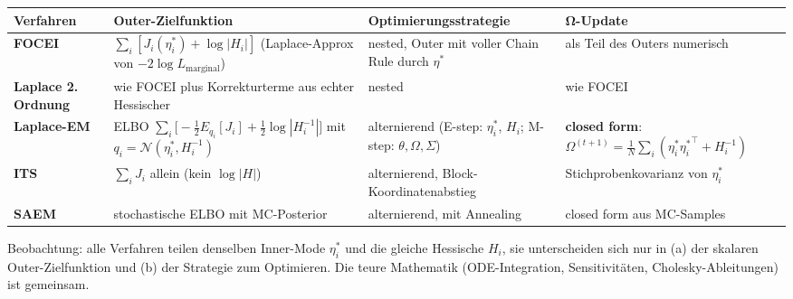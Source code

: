 \documentclass[
]{article}
\newcounter{none} %
\begin{document}
{\def\LTcaptype{none} %
\begin{longtable}[]{@{}
  >{\raggedright\arraybackslash}p{}
  >{\raggedright\arraybackslash}p{}
  >{\raggedright\arraybackslash}p{}
  >{\raggedright\arraybackslash}p{}@{}}
\toprule\noalign{}
\begin{minipage}[b]{\linewidth}\raggedright
Verfahren
\end{minipage} & \begin{minipage}[b]{\linewidth}\raggedright
Outer-Zielfunktion
\end{minipage} & \begin{minipage}[b]{\linewidth}\raggedright
Optimierungsstrategie
\end{minipage} & \begin{minipage}[b]{\linewidth}\raggedright
Ω-Update
\end{minipage} \\
\midrule\noalign{}
\endhead
\bottomrule\noalign{}
\endlastfoot
\textbf{FOCEI} & \(\sum_i [J_i(\eta_i^*) + \log|H_i|]\) (Laplace-Approx
von \(-2\log L_{\text{marginal}}\)) & nested, Outer mit voller Chain
Rule durch \(\eta^*\) & als Teil des Outers numerisch \\
\textbf{Laplace 2. Ordnung} & wie FOCEI plus Korrekturterme aus echter
Hessischer & nested & wie FOCEI \\
\textbf{Laplace-EM} & ELBO
\(\sum_i \bigl[-\tfrac{1}{2} E_{q_i}[J_i] + \tfrac{1}{2}\log|H_i^{-1}|\bigr]\)
mit \(q_i = \mathcal{N}(\eta_i^*, H_i^{-1})\) & alternierend (E-step:
\(\eta_i^*\), \(H_i\); M-step: \(\theta, \Omega, \Sigma\)) &
\textbf{closed form}:
\(\Omega^{(t+1)} = \tfrac{1}{N}\sum_i (\eta_i^* {\eta_i^*}^\top + H_i^{-1})\) \\
\textbf{ITS} & \(\sum_i J_i\) allein (kein \(\log|H|\)) & alternierend,
Block-Koordinatenabstieg & Stichprobenkovarianz von \(\eta_i^*\) \\
\textbf{SAEM} & stochastische ELBO mit MC-Posterior & alternierend, mit
Annealing & closed form aus MC-Samples \\
\end{longtable}
}

Beobachtung: alle Verfahren teilen denselben Inner-Mode \(\eta_i^*\) und
die gleiche Hessische \(H_i\), sie unterscheiden sich nur in (a) der
skalaren Outer-Zielfunktion und (b) der Strategie zum Optimieren. Die
teure Mathematik (ODE-Integration, Sensitivitäten, Cholesky-Ableitungen)
ist gemeinsam.
\end{document}
